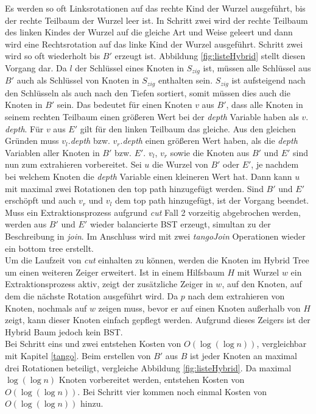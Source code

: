 \documentclass[a4paper,12pt]{article}
\begin{document}
Es werden so oft Linksrotationen auf das rechte Kind der Wurzel ausgeführt, bis der rechte Teilbaum der Wurzel leer ist. In Schritt zwei wird der rechte Teilbaum des linken Kindes der Wurzel auf die gleiche Art und Weise geleert und dann wird eine Rechtsrotation auf das linke Kind der Wurzel ausgeführt. Schritt zwei wird so oft wiederholt bis $B'$ erzeugt ist. Abbildung \ref{fig:listeHybrid} stellt diesen Vorgang dar. Da $l$ der Schlüssel eines Knoten in $S_{zig}$ ist, müssen alle Schlüssel aus $B'$ auch als Schlüssel von Knoten in $S_{zig}$ enthalten sein. $S_{zig}$ ist aufsteigend nach den Schlüsseln als auch nach den Tiefen sortiert, somit müssen dies auch die Knoten in $B'$ sein. Das bedeutet für einen Knoten $v$ aus $B'$, dass alle Knoten in seinem rechten Teilbaum einen größeren Wert bei der \textit{depth} Variable haben als $v.$\textit{depth}. Für  $v$ aus $E'$ gilt für den linken Teilbaum das gleiche. Aus den gleichen Gründen muss $v_l.$\textit{depth} bzw. $v_r.$\textit{depth} einen größeren Wert haben, als die \textit{depth} Variablen aller Knoten in $B'$ bzw. $E'$. $v_l$, $v_r$ sowie die Knoten aus $B'$ und $E'$ sind nun zum extrahieren vorbereitet. Sei $u$ die Wurzel von $B'$ oder $E'$, je nachdem bei welchem Knoten die \textit{depth} Variable einen kleineren Wert hat. Dann kann $u$ mit maximal zwei Rotationen den top path hinzugefügt werden. Sind $B'$ und  $E'$ erschöpft und auch $v_r$ und $v_l$ dem top path hinzugefügt, ist der Vorgang beendet.\\
Muss ein Extraktionsprozess aufgrund \textit{cut} Fall 2 vorzeitig abgebrochen werden, werden aus $B'$ und $E'$ wieder balancierte BST erzeugt, simultan zu der Beschreibung in \textit{join}. Im Anschluss wird mit zwei \textit{tangoJoin} Operationen wieder ein bottom tree erstellt.\\
Um die Laufzeit von \textit{cut} einhalten zu können, werden die Knoten im Hybrid Tree um einen weiteren Zeiger erweitert. Ist in einem Hilfsbaum $H$ mit Wurzel $w$ ein Extraktionsprozess aktiv, zeigt der zusätzliche Zeiger in $w$, auf den Knoten, auf dem die nächste Rotation ausgeführt wird. Da $p$ nach dem extrahieren von Knoten, nochmals auf $w$ zeigen muss, bevor er auf einen Knoten außerhalb von $H$ zeigt, kann dieser Knoten einfach gepflegt werden. Aufgrund dieses Zeigers ist der Hybrid Baum jedoch kein BST.\\
Bei Schritt eins und zwei entstehen Kosten von $O\left(\log \left(\log n\right)\right)$, vergleichbar mit Kapitel \ref{tango}. Beim erstellen von $B'$ aus $B$ ist jeder Knoten an maximal drei Rotationen beteiligt, vergleiche Abbildung \ref{fig:listeHybrid}. Da maximal  $\log\left(\log n\right)$ Knoten vorbereitet werden, entstehen Kosten von  $O\left(\log\left(\log n\right)\right)$. Bei Schritt vier kommen noch einmal Kosten von $O\left(\log\left(\log n\right)\right)$ hinzu.
\end{document}

